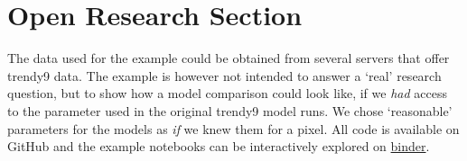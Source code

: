 





%
%

\section*{Open Research Section}
The data used for the example could be obtained from several servers that offer trendy9 data.
The example is however not intended to answer a `real' research question, but to show how a model comparison could look like,
if we \emph{had} access to the parameter used in the original trendy9 model runs.
We chose `reasonable' parameters for the models as \emph{if} we knew them for a pixel.
All code is available on GitHub and the example notebooks can be interactively explored on \href{https://mybinder.org/v2/gh/MPIBGC-TEE/bgc_md2/binder}{binder}.


